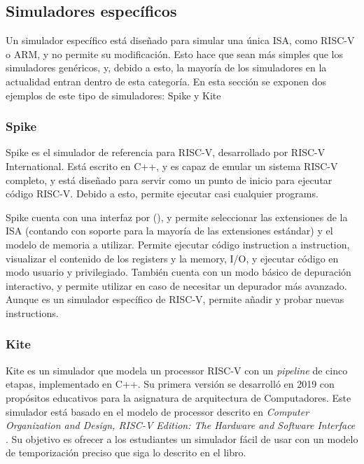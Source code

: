 \subsection{Simuladores específicos}

Un simulador específico está diseñado para simular una única \gls{ISA}, como
RISC-V o ARM, y no permite su modificación. Esto hace que sean más simples que
los simuladores genéricos, y, debido a esto, la mayoría de los simuladores en la
actualidad entran dentro de esta categoría. En esta sección se exponen dos
ejemplos de este tipo de simuladores: Spike y Kite

\subsubsection{Spike}

Spike \parencite{spike} es el simulador de referencia para RISC-V, desarrollado
por RISC-V International. Está escrito en C++, y es capaz de emular un sistema RISC-V completo, y está
diseñado para servir como un punto de inicio para ejecutar código RISC-V. Debido
a esto, permite ejecutar casi cualquier \glspl{program}.

Spike cuenta con una interfaz por 
(), y permite seleccionar las extensiones de la \gls{ISA}
(contando con soporte para la mayoría de las extensiones estándar) y el modelo
de memoria a utilizar. Permite ejecutar código \gls{instruction} a
\gls{instruction}, visualizar el contenido de los \glspl{register} y la
\gls{memory}, I/O, y ejecutar código en modo usuario y privilegiado. También cuenta
con un modo básico de depuración interactivo, y permite utilizar 
en caso de necesitar un depurador más avanzado. Aunque es un simulador
específico de RISC-V, permite añadir y probar nuevas \glspl{instruction}.


\subsubsection{Kite}

Kite \parencite{kite} \parencite{kite-gh} es un simulador que modela un
\gls{processor} RISC-V con un \textit{pipeline} de cinco etapas, implementado en
C++. Su primera versión se desarrolló en 2019 con propósitos educativos para la
asignatura de arquitectura de Computadores. Este simulador está basado en el
modelo de \gls{processor} descrito en \textit{Computer Organization and Design,
RISC-V Edition: The Hardware and Software Interface} \parencite{kite-book}. Su
objetivo es ofrecer a los estudiantes un simulador fácil de usar con un modelo
de temporización preciso que siga lo descrito en el libro.

